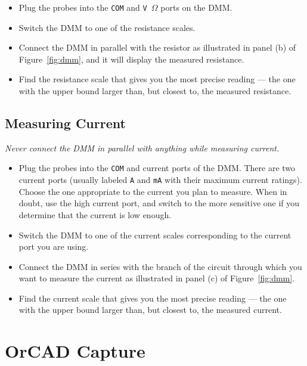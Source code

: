 \documentclass[11pt]{article}
\begin{document}
\begin{itemize}
\item Plug the probes into the \texttt{COM} and \texttt{V\,$\Omega$}
  ports on the DMM.

\item Switch the DMM to one of the resistance scales.
  
\item Connect the DMM in parallel with the resistor as illustrated in
  panel (b) of Figure~\ref{fig:dmm}, and it will display the measured
  resistance.

\item Find the resistance scale that gives you the most
  precise reading --- the one with the upper bound larger than, but
  closest to, the measured resistance.
\end{itemize}

\subsection{Measuring Current}

\emph{Never connect the DMM in parallel with anything while measuring
  current.}

\begin{itemize}
\item Plug the probes into the \texttt{COM} and current ports of the
  DMM. There are two current ports (usually labeled \texttt{A} and
  \texttt{mA} with their maximum current ratings). Choose the one
  appropriate to the current you plan to measure. When in doubt, use
  the high current port, and switch to the more sensitive one if you
  determine that the current is low enough.

\item Switch the DMM to one of the current scales corresponding to the
  current port you are using.

\item Connect the DMM in series with the branch of the circuit through
  which you want to measure the current as illustrated in panel (c) of
  Figure~\ref{fig:dmm}.
  
\item Find the current scale that gives you the most precise reading
  --- the one with the upper bound larger than, but closest to, the
  measured current.
\end{itemize}

\section{OrCAD Capture}
\label{sec:orcad}
\end{document}
